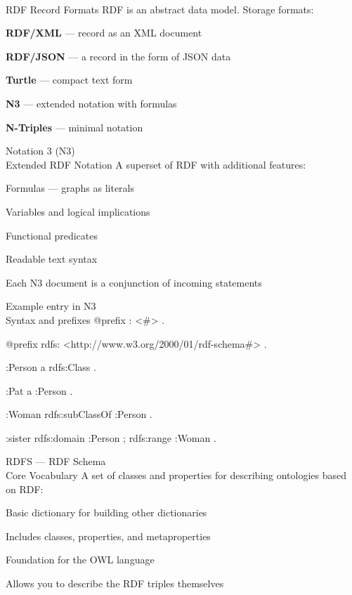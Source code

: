 \begin{frame}{\\RDF Record Formats}
	\topline
	\justifying
	RDF is an abstract data model. Storage formats:
	\begin{textitemize}
		\item \textbf{RDF/XML} --- record as an XML document
		\item \textbf{RDF/JSON} --- a record in the form of JSON data
		\item \textbf{Turtle} --- compact text form
		\item \textbf{N3} --- extended notation with formulas
		\item \textbf{N-Triples} --- minimal notation
	\end{textitemize}
\end{frame}

\begin{frame}{Notation 3 (N3)\\Extended RDF Notation}
	\topline
	\justifying
	A superset of RDF with additional features:
	\begin{textitemize}
		\item Formulas --- graphs as literals
		\item Variables and logical implications
		\item Functional predicates
		\item Readable text syntax
	\end{textitemize}
	
	Each N3 document is a conjunction of incoming statements
\end{frame}

\begin{frame}{Example entry in N3\\Syntax and prefixes}
	\topline
	\justifying
	@prefix : <\#> .
	
	@prefix rdfs: <http://www.w3.org/2000/01/rdf-schema\#> .
	
	\vspace{0.3cm}
	:Person a rdfs:Class .
	
	:Pat a :Person .
	
	:Woman rdfs:subClassOf :Person .
	
	:sister rdfs:domain :Person ; rdfs:range :Woman .
\end{frame}

\begin{frame}{RDFS --- RDF Schema\\Core Vocabulary}
	\topline
	\justifying
	A set of classes and properties for describing ontologies based on RDF:
	\begin{textitemize}
		\item Basic dictionary for building other dictionaries
		\item Includes classes, properties, and metaproperties
		\item Foundation for the OWL language
		\item Allows you to describe the RDF triples themselves
	\end{textitemize}
\end{frame}

